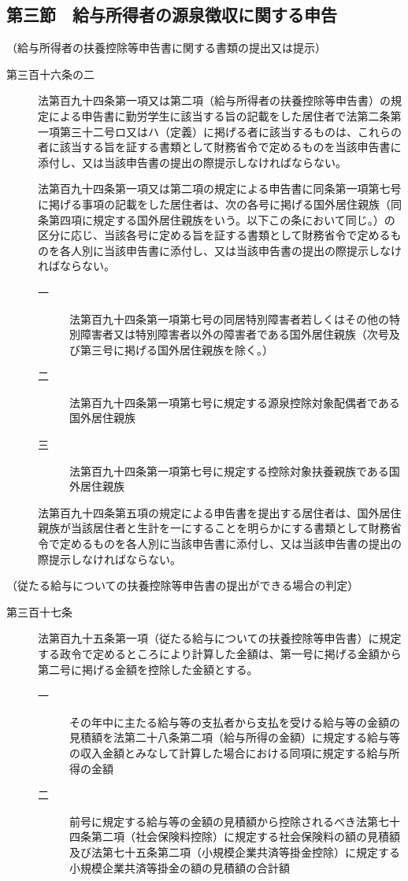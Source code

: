 \documentclass[twocolumn,a4j,10pt]{ltjtarticle}
\begin{document}
\subsection*{第三節　給与所得者の源泉徴収に関する申告}
\noindent\hspace{10pt}（給与所得者の扶養控除等申告書に関する書類の提出又は提示）
\begin{description}
\item[第三百十六条の二]法第百九十四条第一項又は第二項（給与所得者の扶養控除等申告書）の規定による申告書に勤労学生に該当する旨の記載をした居住者で法第二条第一項第三十二号ロ又はハ（定義）に掲げる者に該当するものは、これらの者に該当する旨を証する書類として財務省令で定めるものを当該申告書に添付し、又は当該申告書の提出の際提示しなければならない。
\item[]法第百九十四条第一項又は第二項の規定による申告書に同条第一項第七号に掲げる事項の記載をした居住者は、次の各号に掲げる国外居住親族（同条第四項に規定する国外居住親族をいう。以下この条において同じ。）の区分に応じ、当該各号に定める旨を証する書類として財務省令で定めるものを各人別に当該申告書に添付し、又は当該申告書の提出の際提示しなければならない。
\begin{description}
\item[一]法第百九十四条第一項第七号の同居特別障害者若しくはその他の特別障害者又は特別障害者以外の障害者である国外居住親族（次号及び第三号に掲げる国外居住親族を除く。）
\item[二]法第百九十四条第一項第七号に規定する源泉控除対象配偶者である国外居住親族
\item[三]法第百九十四条第一項第七号に規定する控除対象扶養親族である国外居住親族
\end{description}
\item[]法第百九十四条第五項の規定による申告書を提出する居住者は、国外居住親族が当該居住者と生計を一にすることを明らかにする書類として財務省令で定めるものを各人別に当該申告書に添付し、又は当該申告書の提出の際提示しなければならない。
\end{description}
\noindent\hspace{10pt}（従たる給与についての扶養控除等申告書の提出ができる場合の判定）
\begin{description}
\item[第三百十七条]法第百九十五条第一項（従たる給与についての扶養控除等申告書）に規定する政令で定めるところにより計算した金額は、第一号に掲げる金額から第二号に掲げる金額を控除した金額とする。
\begin{description}
\item[一]その年中に主たる給与等の支払者から支払を受ける給与等の金額の見積額を法第二十八条第二項（給与所得の金額）に規定する給与等の収入金額とみなして計算した場合における同項に規定する給与所得の金額
\item[二]前号に規定する給与等の金額の見積額から控除されるべき法第七十四条第二項（社会保険料控除）に規定する社会保険料の額の見積額及び法第七十五条第二項（小規模企業共済等掛金控除）に規定する小規模企業共済等掛金の額の見積額の合計額
\end{description}
\end{description}
\end{document}
